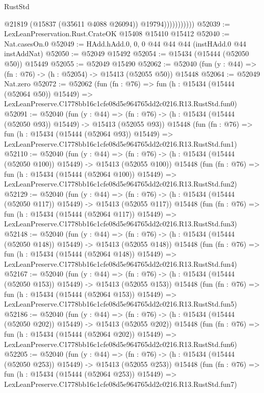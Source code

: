 \begin{lexlean}{RustStd}
\begin{coremodule}
                          @21819
                          (@15837 (@35611 @4088 @26094))
                          @19794)))))))))))
@52039 := LexLeanPreservation.Rust.CrateOK @15408 @15410 @15412
@52040 := Nat.casesOn.{0}
@52049 := HAdd.hAdd.{0, 0, 0} @44 @44 @44 (instHAdd.{0} @44 instAddNat)
@52050 := @52049 @15492
@52054 := @15434 (@15444 (@52050 @50)) @15449
@52055 := @52049 @15490
@52062 := @52040 (fun (y : @44) => (fn : @76) -> (h : @52054) -> @15413 (@52055 @50)) @15448
@52064 := @52049 Nat.zero
@52072 := @52062
    (fun (fn : @76) =>
    fun (h : @15434 (@15444 (@52064 @50)) @15449) =>
    LexLeanPreserve.C1778bb16c1cfe08d5e964765dd2c0216.R13.RustStd.fun0)
@52091 := @52040
    (fun (y : @44) =>
    (fn : @76) -> (h : @15434 (@15444 (@52050 @93)) @15449) -> @15413 (@52055 @93))
    @15448
    (fun (fn : @76) =>
    fun (h : @15434 (@15444 (@52064 @93)) @15449) =>
    LexLeanPreserve.C1778bb16c1cfe08d5e964765dd2c0216.R13.RustStd.fun1)
@52110 := @52040
    (fun (y : @44) =>
    (fn : @76) -> (h : @15434 (@15444 (@52050 @100)) @15449) -> @15413 (@52055 @100))
    @15448
    (fun (fn : @76) =>
    fun (h : @15434 (@15444 (@52064 @100)) @15449) =>
    LexLeanPreserve.C1778bb16c1cfe08d5e964765dd2c0216.R13.RustStd.fun2)
@52129 := @52040
    (fun (y : @44) =>
    (fn : @76) -> (h : @15434 (@15444 (@52050 @117)) @15449) -> @15413 (@52055 @117))
    @15448
    (fun (fn : @76) =>
    fun (h : @15434 (@15444 (@52064 @117)) @15449) =>
    LexLeanPreserve.C1778bb16c1cfe08d5e964765dd2c0216.R13.RustStd.fun3)
@52148 := @52040
    (fun (y : @44) =>
    (fn : @76) -> (h : @15434 (@15444 (@52050 @148)) @15449) -> @15413 (@52055 @148))
    @15448
    (fun (fn : @76) =>
    fun (h : @15434 (@15444 (@52064 @148)) @15449) =>
    LexLeanPreserve.C1778bb16c1cfe08d5e964765dd2c0216.R13.RustStd.fun4)
@52167 := @52040
    (fun (y : @44) =>
    (fn : @76) -> (h : @15434 (@15444 (@52050 @153)) @15449) -> @15413 (@52055 @153))
    @15448
    (fun (fn : @76) =>
    fun (h : @15434 (@15444 (@52064 @153)) @15449) =>
    LexLeanPreserve.C1778bb16c1cfe08d5e964765dd2c0216.R13.RustStd.fun5)
@52186 := @52040
    (fun (y : @44) =>
    (fn : @76) -> (h : @15434 (@15444 (@52050 @202)) @15449) -> @15413 (@52055 @202))
    @15448
    (fun (fn : @76) =>
    fun (h : @15434 (@15444 (@52064 @202)) @15449) =>
    LexLeanPreserve.C1778bb16c1cfe08d5e964765dd2c0216.R13.RustStd.fun6)
@52205 := @52040
    (fun (y : @44) =>
    (fn : @76) -> (h : @15434 (@15444 (@52050 @253)) @15449) -> @15413 (@52055 @253))
    @15448
    (fun (fn : @76) =>
    fun (h : @15434 (@15444 (@52064 @253)) @15449) =>
    LexLeanPreserve.C1778bb16c1cfe08d5e964765dd2c0216.R13.RustStd.fun7)

\end{coremodule}
\end{lexlean}
